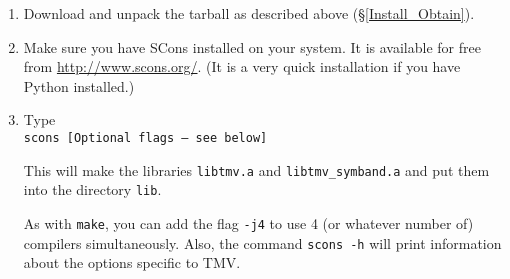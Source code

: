 \begin{enumerate}
\item Download and unpack the tarball as described above (\S\ref{Install_Obtain}).

\item Make sure you have SCons installed on your system.  
It is available for free from \url{http://www.scons.org/}.  (It is a
very quick installation if you have Python installed.)

\item Type \\
\texttt{scons [Optional flags -- see below]}

This will make the libraries \texttt{libtmv.a} and \texttt{libtmv\_symband.a}
and put them into the directory \texttt{lib}. 

As with \texttt{make}, you can add
the flag \texttt{-j4} to use 4 (or whatever number of) compilers simultaneously.
Also, the command \texttt{scons -h} will print information
about the options specific to TMV.


\end{enumerate}
